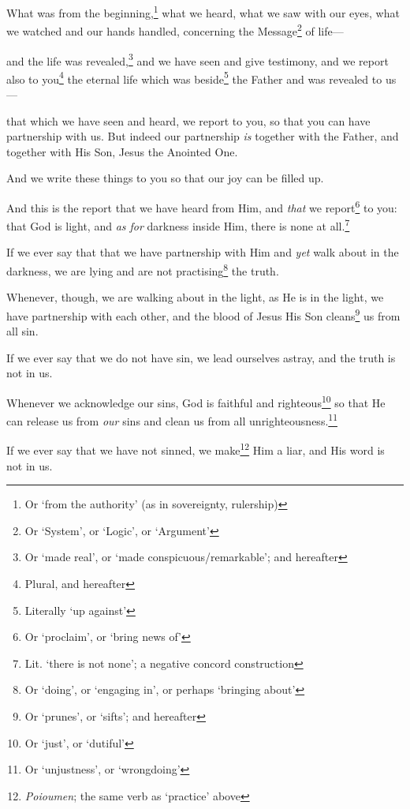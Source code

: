 \documentclass[article]{memoir}%
\newcounter{vnum}
\renewcommand*{\chapter}{
	\vspace{\baselineskip}
	\settowidth{\chapindent}{\chapnumfont 999}
	\noindent\llap{\makebox[\chapindent][l]{%
		\chapnumfont \thechapter}}%
	\addtocounter{chapter}{1}
	\setcounter{vnum}{1}
}
\newcommand{\vnum}{%
	\textsuperscript{\thevnum}%
	\addtocounter{vnum}{1}%
}
\newcommand{\infer}[1]{\textit{#1}}
\newcommand{\focus}[1]{{#1}}
\renewcommand*{\book}[1]{%
	\makebox[\textwidth][c]{\centering \booktitlefont #1}%
	\setcounter{chapter}{1}
}
\begin{document}
\book{1 John}
	
\chapter{} \vnum What was from the beginning,\footnote{Or ‘from the authority’ (as in sovereignty, rulership)} what we heard, what we saw with our eyes, what we watched and our hands handled, concerning the Message\footnote{Or ‘System’, or ‘Logic’, or ‘Argument’} of life---\vnum and the life was revealed,\footnote{Or `made real', or `made conspicuous/remarkable'; and hereafter} and we have seen and give testimony, and we report also to you\footnote{Plural, and hereafter} the eternal life which was beside\footnote{Literally ‘up against’} the Father and was revealed to us---\vnum that which we have seen and heard, we report to you, so that you can have partnership with us. But indeed our partnership \infer{is} together with the Father, and together with His Son, Jesus the Anointed One. \vnum And we write these things to you so that our joy can be filled up.

\vnum And \focus{this} is the report that we have heard from Him, and \infer{that} we report\footnote{Or `proclaim', or `bring news of'} to you: that God is light, and \infer{as for} darkness inside Him, there is none at all.\footnote{Lit. `there is not none'; a negative concord construction} \vnum If we ever say that that we have partnership with Him and \infer{yet} walk about in the darkness, we are lying and are not practising\footnote{Or `doing', or `engaging in', or perhaps `bringing about'} the truth. \vnum Whenever, though, we are walking about in the light, as He is in the light, we have partnership with each other, and the blood of Jesus His Son cleans\footnote{Or `prunes', or `sifts'; and hereafter} us from all sin. \vnum If we ever say that we do not have sin, we lead ourselves astray, and the truth is not in us. \vnum Whenever we acknowledge our sins, God is faithful and righteous\footnote{Or `just', or `dutiful'} so that He can release us from \infer{our} sins and clean us from all unrighteousness.\footnote{Or `unjustness', or `wrongdoing'} \vnum If we ever say that we have not sinned, we make\footnote{\textit{Poioumen}; the same verb as `practice' above} Him a liar, and His word is not in us.
\end{document}
